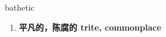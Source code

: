 
\begin{frame}
{\huge bathetic}
\begin{center}
\begin{enumerate}\Large
  \item \textbf{平凡的，陈腐的 trite, commonplace}
\end{enumerate}
\end{center}
\end{frame}
